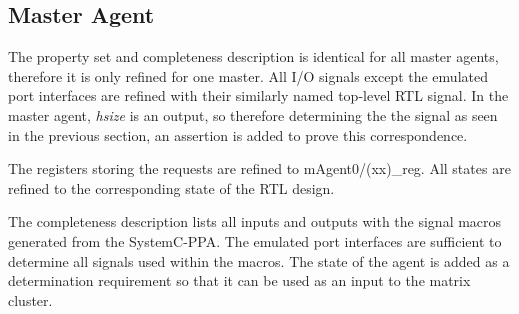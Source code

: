 \subsection{Master Agent}
The property set and completeness description is identical for all master agents, therefore it is only refined for one master. 
All I/O signals except the emulated port interfaces are refined with their similarly named top-level RTL signal. In the master agent, \textit{hsize} is an output, so therefore determining the the signal as seen in the previous section, an assertion is added to prove this correspondence. \par
The registers storing the requests are refined to mAgent0/(xx)\_reg. All states are refined to the corresponding state of the RTL design.\par
The completeness description lists all inputs and outputs with the signal macros generated from the SystemC-PPA. The emulated port interfaces are sufficient to determine all signals used within the macros. The state of the agent is added as a determination requirement so that it can be used as an input to the matrix cluster.  

